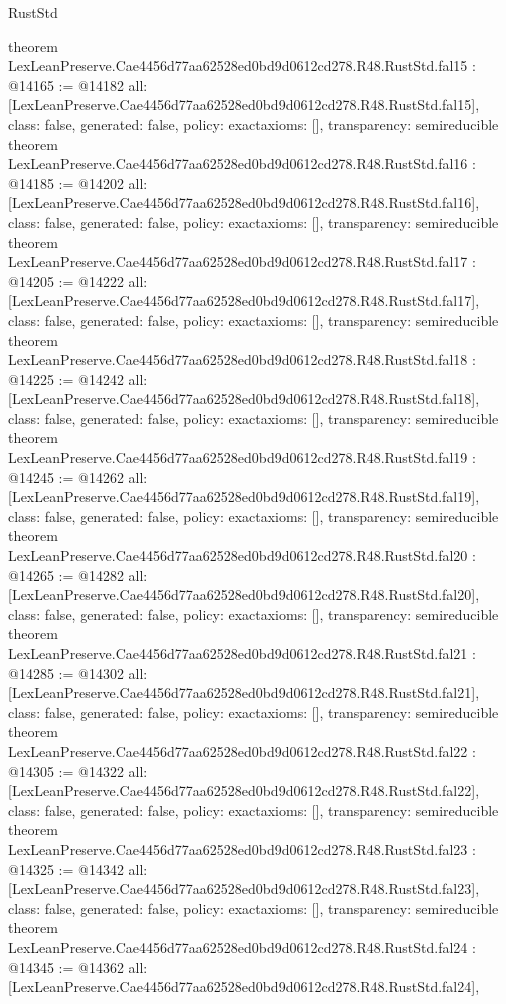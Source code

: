 \begin{lexlean}{RustStd}
\begin{coremodule}
{}
theorem LexLeanPreserve.Cae4456d77aa62528ed0bd9d0612cd278.R48.RustStd.fal15 : @14165 := @14182 {
  all: [LexLeanPreserve.Cae4456d77aa62528ed0bd9d0612cd278.R48.RustStd.fal15],
  class: false,
  generated: false,
  policy: exact{axioms: []},
  transparency: semireducible
}
theorem LexLeanPreserve.Cae4456d77aa62528ed0bd9d0612cd278.R48.RustStd.fal16 : @14185 := @14202 {
  all: [LexLeanPreserve.Cae4456d77aa62528ed0bd9d0612cd278.R48.RustStd.fal16],
  class: false,
  generated: false,
  policy: exact{axioms: []},
  transparency: semireducible
}
theorem LexLeanPreserve.Cae4456d77aa62528ed0bd9d0612cd278.R48.RustStd.fal17 : @14205 := @14222 {
  all: [LexLeanPreserve.Cae4456d77aa62528ed0bd9d0612cd278.R48.RustStd.fal17],
  class: false,
  generated: false,
  policy: exact{axioms: []},
  transparency: semireducible
}
theorem LexLeanPreserve.Cae4456d77aa62528ed0bd9d0612cd278.R48.RustStd.fal18 : @14225 := @14242 {
  all: [LexLeanPreserve.Cae4456d77aa62528ed0bd9d0612cd278.R48.RustStd.fal18],
  class: false,
  generated: false,
  policy: exact{axioms: []},
  transparency: semireducible
}
theorem LexLeanPreserve.Cae4456d77aa62528ed0bd9d0612cd278.R48.RustStd.fal19 : @14245 := @14262 {
  all: [LexLeanPreserve.Cae4456d77aa62528ed0bd9d0612cd278.R48.RustStd.fal19],
  class: false,
  generated: false,
  policy: exact{axioms: []},
  transparency: semireducible
}
theorem LexLeanPreserve.Cae4456d77aa62528ed0bd9d0612cd278.R48.RustStd.fal20 : @14265 := @14282 {
  all: [LexLeanPreserve.Cae4456d77aa62528ed0bd9d0612cd278.R48.RustStd.fal20],
  class: false,
  generated: false,
  policy: exact{axioms: []},
  transparency: semireducible
}
theorem LexLeanPreserve.Cae4456d77aa62528ed0bd9d0612cd278.R48.RustStd.fal21 : @14285 := @14302 {
  all: [LexLeanPreserve.Cae4456d77aa62528ed0bd9d0612cd278.R48.RustStd.fal21],
  class: false,
  generated: false,
  policy: exact{axioms: []},
  transparency: semireducible
}
theorem LexLeanPreserve.Cae4456d77aa62528ed0bd9d0612cd278.R48.RustStd.fal22 : @14305 := @14322 {
  all: [LexLeanPreserve.Cae4456d77aa62528ed0bd9d0612cd278.R48.RustStd.fal22],
  class: false,
  generated: false,
  policy: exact{axioms: []},
  transparency: semireducible
}
theorem LexLeanPreserve.Cae4456d77aa62528ed0bd9d0612cd278.R48.RustStd.fal23 : @14325 := @14342 {
  all: [LexLeanPreserve.Cae4456d77aa62528ed0bd9d0612cd278.R48.RustStd.fal23],
  class: false,
  generated: false,
  policy: exact{axioms: []},
  transparency: semireducible
}
theorem LexLeanPreserve.Cae4456d77aa62528ed0bd9d0612cd278.R48.RustStd.fal24 : @14345 := @14362 {
  all: [LexLeanPreserve.Cae4456d77aa62528ed0bd9d0612cd278.R48.RustStd.fal24],
}
\end{coremodule}
\end{lexlean}
